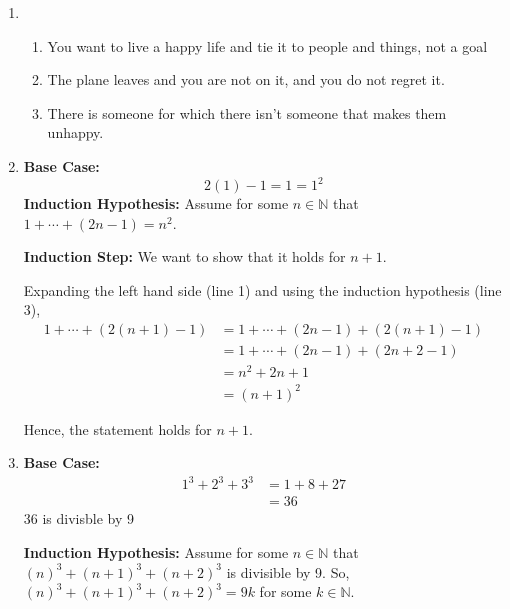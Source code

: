 \documentclass[12pt]{article}
\begin{document}

\begin{enumerate}[start=1,label={\bfseries Exercise \arabic*:},leftmargin=1in] %
    \item \begin{enumerate}
        \item You want to live a happy life and tie it to people and things, not a goal
        \item The plane leaves and you are not on it, and you do not regret it.
        \item There is someone for which there isn't someone that makes them unhappy.
    \end{enumerate}
    
    \item \textbf{Base Case:}
    \[
    2(1) - 1 = 1 = 1^2
    \]
    \textbf{Induction Hypothesis:} Assume for some $n \in \mathbb{N}$ that $1 + \cdots + (2n - 1) = n^2$. 
    
    \textbf{Induction Step:} We want to show that it holds for $n + 1$. 

    Expanding the left hand side (line 1) and using the induction hypothesis (line 3),
    \begin{align*}
        1 + \cdots + (2(n+1) - 1) &= 1 + \cdots + (2n - 1) + (2(n+1) - 1)\\
        &= 1 + \cdots + (2n - 1) + (2n + 2 - 1) \\
        &= n^2 + 2n + 1\\
        &= (n + 1)^2
    \end{align*}

    Hence, the statement holds for $n+1$. 

    \item \textbf{Base Case:} 
    \begin{align*}
        1^3 + 2^3 + 3^3 &= 1 + 8 + 27\\
        &= 36
    \end{align*}
    36 is divisble by 9

    \textbf{Induction Hypothesis:} Assume for some $n \in \mathbb{N}$ that $(n)^3 + (n+1)^3 + (n+2)^3$ is divisible by 9. 
    So, $(n)^3 + (n+1)^3 + (n+2)^3 = 9k$ for some $k \in \mathbb{N}$.


\end{enumerate}
\end{document}
